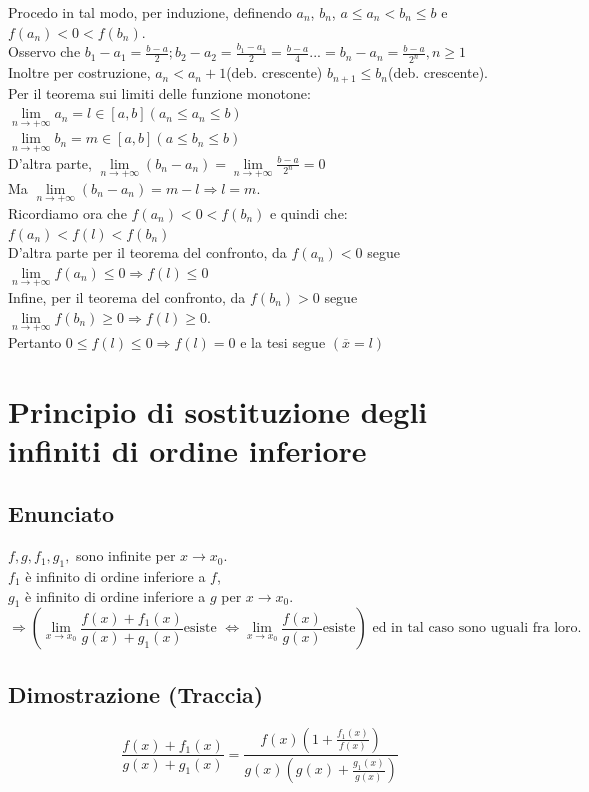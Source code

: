 \documentclass{article}
\newcommand{\vSpace}{\vspace{1em}}
\newcommand{\hSpace}{\hspace{1em}}
\begin{document}
\begin{flushleft}
Procedo in tal modo, per induzione, definendo $a_n$, $b_n$, $a \leq a_n < b_n \leq b$ e $f(a_n) < 0 < f(b_n)$.\\
Osservo che $b_1 - a_1 = \frac{b-a}{2}; b_2-a_2 = \frac{b_1-a_1}{2} = \frac{b-a}{4}...=b_n - a_n = \frac{b-a}{2^n}, n \geq 1$\\
Inoltre per costruzione, $a_n < a_n+1$(deb. crescente) $b_{n+1} \leq b_n$(deb. crescente).\\
Per il teorema sui limiti delle funzione monotone:\\
\hSpace $\lim\limits_{n \to + \infty}a_n = l \in [a,b] (a_n \leq a_n \leq b)$\\
\hSpace $\lim\limits_{n \to + \infty}b_n = m \in [a,b] (a \leq b_n \leq b)$\\
D'altra parte, $\lim\limits_{n \to + \infty}(b_n - a_n) = \lim\limits_{n \to + \infty}\frac{b-a}{2^n} = 0$\\
Ma $\lim\limits_{n \to + \infty} (b_n - a_n) = m - l \Rightarrow l = m$.\\
Ricordiamo ora che $f(a_n) < 0 < f(b_n)$ e quindi che: $f(a_n) < f(l) < f(b_n)$\\
\vSpace
D'altra parte per il teorema del confronto, da $f(a_n) < 0$ segue $\lim\limits_{n \to + \infty}f(a_n) \leq 0 \Rightarrow f(l) \leq 0$\\
Infine, per il teorema del confronto, da $f(b_n) > 0 $ segue $\lim\limits_{n \to + \infty}f(b_n) \geq 0 \Rightarrow f(l) \geq 0$.\\
Pertanto $0 \leq f(l) \leq 0 \Rightarrow f(l) = 0$ e la tesi segue $(\overline{x} = l)$

\section{Principio di sostituzione degli infiniti di ordine inferiore}
\subsection{Enunciato}
$f, g, f_1, g_1,$ sono infinite per $ x \to x_0$.\\
$f_1$ è infinito di ordine inferiore a $f$,\\
$g_1$ è infinito di ordine inferiore a $g$ per $x \to x_0$.
\[
\Rightarrow (\lim\limits_{x \to x_0}\frac{f(x)+f_1(x)}{g(x)+g_1(x)} \text{esiste } \iff \lim\limits_{x \to x_0}\frac{f(x)}{g(x)} \text{esiste})\text{ ed in tal caso sono uguali fra loro.}
\]
\subsection{Dimostrazione (Traccia)}
\[\frac{f(x)+f_1(x)}{g(x)+g_1(x)} = \frac{f(x)(1 + \frac{f_1(x)}{f(x)})}{g(x)(g(x) + \frac{g_1(x)}{g(x)})}\]


\end{flushleft}
\end{document}
